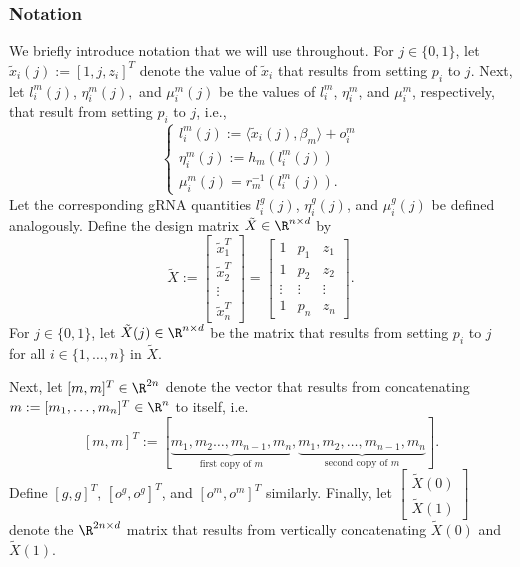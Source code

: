 \documentclass[12pt]{article}
\begin{document}
\subsubsection*{Notation}
We briefly introduce notation that we will use throughout. For $j \in \{0,1\}$, let $\tilde{x}_i(j) := [1, j, z_i]^T$ denote the value of $\tilde{x}_i$ that results from setting $p_i$ to $j$. Next, let  $l^m_i(j)$, $\eta^m_i(j),$ and $\mu^m_i(j)$ be the values of $l^m_i$, $\eta^m_i$, and $\mu^m_i$, respectively, that result from setting $p_i$ to $j$, i.e.,
$$
\begin{cases}
l^m_i(j) := \langle \tilde{x}_i(j), \beta_m \rangle + o^m_i \\ \eta^m_i(j) := h_m(l^m_i(j)) \\
\mu_i^m(j) = r_m^{-1}(l^m_i(j)).
\end{cases}
$$
Let the corresponding gRNA quantities $l^g_i(j)$, $\eta_i^g(j)$, and $\mu^g_i(j)$ be defined analogously. Define the design matrix $\tilde{X} \in \R^{n \times d}$ by
$$ \tilde{X} := \begin{bmatrix}
\tilde{x}_1^T \\ \tilde{x}_2^T \\ \vdots \\ \tilde{x}_n^T
\end{bmatrix} = 
\begin{bmatrix}
1 & p_1 & z_1 \\
1 & p_2 & z_2 \\ 
\vdots & \vdots & \vdots \\
1 & p_n & z_n
\end{bmatrix}.$$ For $j \in \{0,1\}$, let $\tilde{X}(j) \in \R^{n \times d}$ be the matrix that results from setting $p_i$ to $j$ for all $i \in \{1, \dots, n\}$ in $\tilde{X}$.

Next, let $[m,m]^T \in \R^{2n}$ denote the vector that results from concatenating $m := [m_1, \dots, m_n]^T \in \R^n$ to itself, i.e.
$$ [m,m]^T := [\underbrace{m_1, m_2 \dots, m_{n-1}, m_n}_\textrm{first copy of $m$}, \underbrace{m_1, m_2, \dots, m_{n-1}, m_n}_\textrm{second copy of $m$}].$$ Define $[g,g]^T$, $[o^g,o^g]^T$, and $[o^m,o^m]^T$ similarly. Finally, let $\begin{bmatrix} \tilde{X}(0) \\ \tilde{X}(1) \end{bmatrix}$ denote the $\R^{2n \times d}$ matrix that results from vertically concatenating $\tilde{X}(0)$ and $\tilde{X}(1)$.
\end{document}
